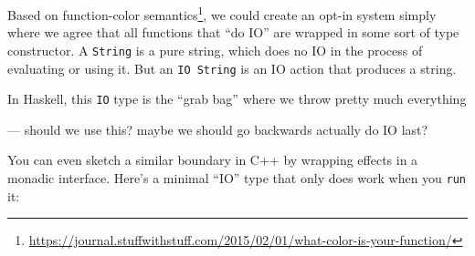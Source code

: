 \documentclass[]{article}
\renewcommand{\href}[2]{#2\footnote{\url{#1}}}
\begin{document}
Based on
\href{https://journal.stuffwithstuff.com/2015/02/01/what-color-is-your-function/}{function-color
semantics}, we could create an opt-in system simply where we agree that all
functions that ``do IO'' are wrapped in some sort of type constructor. A
\texttt{String} is a pure string, which does no IO in the process of evaluating
or using it. But an \texttt{IO\ String} is an IO action that produces a string.

In Haskell, this \texttt{IO} type is the ``grab bag'' where we throw pretty much
everything

--- should we use this? maybe we should go backwards actually do IO last?

You can even sketch a similar boundary in C++ by wrapping effects in a monadic
interface. Here's a minimal ``IO'' type that only does work when you
\texttt{run} it:
\end{document}
